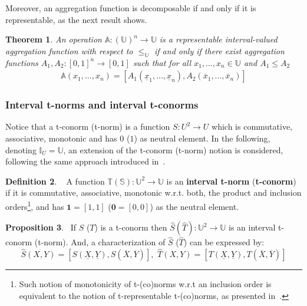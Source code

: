 \documentclass[12pt]{article}
\theoremstyle{plain}
\newtheorem{theorem}{Theorem}[section]
\theoremstyle{remark}
\theoremstyle{definition}
\newtheorem{definition}[theorem]{Definition}
\theoremstyle{proposition}
\newtheorem{proposition}[theorem]{Proposition}
\newcommand{\II}{\mathbb{I} }
\newcommand{\UU}{\mathbb{U} }
\begin{document}
Moreover, an aggregation function is decomposable if and only if it is representable, as the next result shows.

\begin{theorem}\label{teo-S-imp-BIR}
An operation $\mathbb{A} : (\UU)^n \rightarrow \UU$ is a representable interval-valued aggregation function with respect to $\leq_\UU$ if and only if there exist aggregation functions $A_1, A_2 : [0, 1]^n \rightarrow [0, 1]$ such that for all $x_1,...,x_n \in \UU$ and $A_1 \leq A_2$
\begin{eqnarray}
\mathbb{A}(x_1,...,x_n) = [A_1(\underline{x}_1,..., \underline{x}_n), A_2(\overline{x}_1,..., \overline{x}_n)]
\end{eqnarray}
\end{theorem}

\subsubsection{Interval t-norms and interval t-conorms}\label{subsec-3b} 
Notice that  a t-conorm (t-norm) is a function $S:U^2 \rightarrow U$ which is commutative,  associative, monotonic and has $0$ ($1$) as neutral element. In the following, denoting $\II_{U}=\mathbb{U}$, an extension of the t-conorm (t-norm) notion is considered, following the same approach introduced in~\cite{BT06b}.

\begin{definition}~\cite[Definition 5.1]{BT06b} \label{def-itnorm}
A function  $\mathbb{T}(\mathbb{S}):\UU^2 \rightarrow \UU$ is an \textbf{interval t-norm}  (\textbf{t-conorm}) if it is commutative, associative, monotonic w.r.t. both, the product and inclusion orders\footnote{Such notion of monotonicity of t-(co)norms w.r.t an inclusion order is equivalent to the notion of t-representable t-(co)norms, as presented in~\cite{Des08}.}, and has $\mathbf{1}=[1,1]$ ($\mathbf{0}=[0,0]$) as the neutral element.
\end{definition}

\begin{proposition}~\cite[Theorem 5.1]{BT06b}\label{pro-it-norm}
If  $S$ ($T$) is a t-conorm  then $\widehat{S} (\widehat{T}):\UU^2 \rightarrow \UU$ is an interval t-conorm (t-norm).
And, a characterization of $\widehat{S}$ ($\widehat{T}$) can be expressed by:
\begin{equation}\label{eq-int-s}
\widehat{S}(X,Y)=[S(\underline{X},\underline{Y}),
S(\overline{X},\overline{Y})],
\,\, \widehat{T}(X,Y)=[T(\underline{X},\underline{Y}),
T(\overline{X},\overline{Y})]
\end{equation}
\end{proposition}
\end{document}
